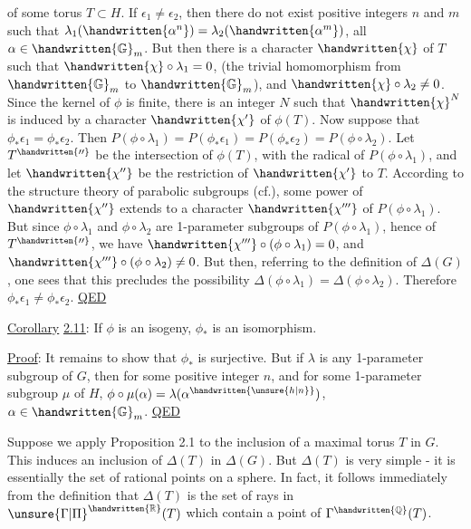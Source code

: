 
of some torus $T\subset H$. If $\epsilon_1\neq\epsilon_2$, then there do not exist positive integers $n$ and $m$ such that $\lambda_1(\handwritten{\alpha^n})=\lambda_2(\handwritten{\alpha^m})$, all $\alpha\in\handwritten{\mathbb{G}}_m$. But then there is a character $\handwritten{\chi}$ of $T$ such that $\handwritten{\chi}\circ\lambda_1=0$, (the trivial homomorphism from $\handwritten{\mathbb{G}}_m$ to $\handwritten{\mathbb{G}}_m$), and $\handwritten{\chi}\circ\lambda_2\neq0$. Since the kernel of $\phi$ is finite, there is an integer $N$ such that $\handwritten{\chi}^N$ is induced by a character $\handwritten{\chi'}$ of $\phi(T)$. Now suppose that $\phi_*\epsilon_1=\phi_*\epsilon_2$. Then $P(\phi\circ\lambda_1)=P(\phi_*\epsilon_1)=P(\phi_*\epsilon_2)=P(\phi\circ\lambda_2)$. Let $T^{\handwritten{\prime\prime}}$ be the intersection of $\phi(T)$, with the radical of $P(\phi\circ\lambda_1)$, and let $\handwritten{\chi''}$ be the restriction of $\handwritten{\chi'}$ to $T$. According to the structure theory of parabolic subgroups (cf.\hspace{4em}), some power of $\handwritten{\chi''}$ extends to a character $\handwritten{\chi'''}$ of $P(\phi\circ\lambda_1)$. But since $\phi\circ\lambda_1$ and $\phi\circ\lambda_2$ are 1-parameter subgroups of $P(\phi\circ\lambda_1)$, hence of $T^{\handwritten{\prime\prime}}$, we have $\handwritten{\chi'''}\circ(\phi\circ\lambda_1)=0$, and $\handwritten{\chi'''}\circ(\phi\circ\lambda_2)\neq0$. But then, referring to the definition of $\Delta(G)$, one sees that this precludes the possibility $\Delta(\phi\circ\lambda_1)=\Delta(\phi\circ\lambda_2)$. Therefore $\phi_*\epsilon_1\neq\phi_*\epsilon_2$. \uline{QED}

\uline{Corollary} \uline{2.11}: If $\phi$ is an isogeny, $\phi_*$ is an isomorphism.

\uline{Proof}: It remains to show that $\phi_*$ is surjective. But if $\lambda$ is any 1-parameter subgroup of $G$, then for some positive integer $n$, and for some 1-parameter subgroup $\mu$ of $H$, $\phi\circ\mu(\alpha)=\lambda(\alpha^{\handwritten{\unsure{h|n}}})$, $\alpha\in\handwritten{\mathbb{G}}_m$. \uline{QED}

Suppose we apply Proposition 2.1 to the inclusion of a maximal torus $T$ in $G$. This induces an inclusion of $\Delta(T)$ in $\Delta(G)$. But $\Delta(T)$ is very simple - it is essentially the set of rational points on a sphere. In fact, it follows immediately from the definition that $\Delta(T)$ is the set of rays in $\unsure{\Gamma|\Pi}^{\handwritten{\mathbb{R}}}(T)$ which contain a point of $\Gamma^{\handwritten{\mathbb{Q}}}(T)$.
